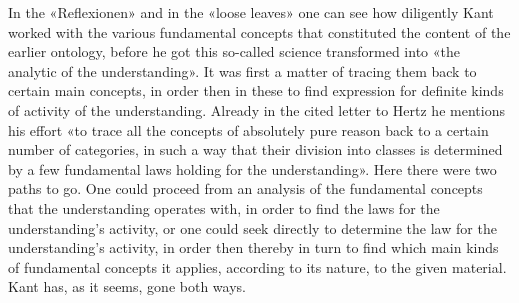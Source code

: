 \documentclass[12pt,a4paper]{article}
\newcommand{\opage}[1]{\marginnote{\footnotesize\textit{[#1]}}}
\begin{document}
In the «Reflexionen» and in the «loose leaves» one can see how diligently
Kant worked with the various fundamental concepts that constituted the content
of the earlier ontology, before he got this so-called science transformed into
«the analytic of the understanding». It was first a matter of tracing them
back to certain main concepts, in order then in these to find expression for
definite kinds of activity of the understanding. Already in the cited letter
to Hertz he \opage{53}mentions his effort «to trace all the concepts of absolutely pure
reason back to a certain number of categories, in such a way that their
division into classes is determined by a few fundamental laws holding for the
understanding». Here there were two paths to go. One could proceed from an
analysis of the fundamental concepts that the understanding operates with, in
order to find the laws for the understanding's activity, or one could seek
directly to determine the law for the understanding's activity, in order then
thereby in turn to find which main kinds of fundamental concepts it applies,
according to its nature, to the given material. Kant has, as it seems, gone
both ways.
\end{document}
